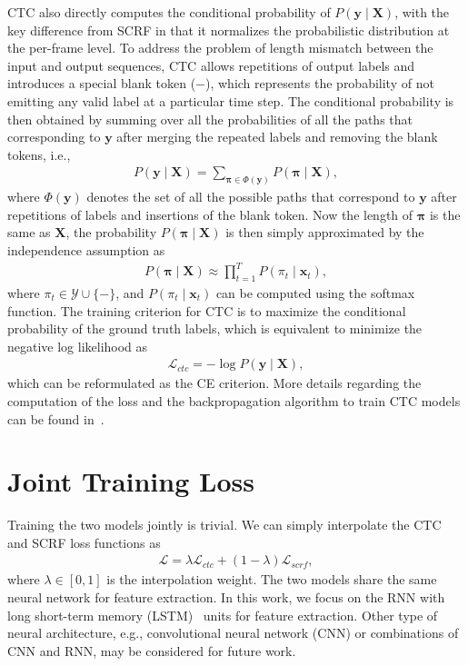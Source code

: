 \documentclass[a4paper]{article}
\begin{document}
CTC also directly computes the conditional probability of $P(\bm y \mid \bm X)$, with the key difference from SCRF in that it normalizes the probabilistic distribution at the per-frame level. To address the problem of length mismatch between the input and output sequences, CTC allows repetitions of output labels and introduces a special  blank token ($-$), which represents the probability of not emitting any valid label at a particular time step. The conditional probability is then obtained by summing over all the probabilities of all the paths that corresponding to $\bm y$ after merging the repeated labels and removing the blank tokens, i.e.,
\begin{align} 
P(\bm y \mid \bm X) = \sum_{\bm \pi \in \Phi(\bm y)} P(\bm \pi \mid \bm X),
\end{align}
where $\Phi(\bm y)$ denotes the set of all the possible paths that correspond to $\bm y$ after repetitions of labels and insertions of the blank token. Now the length of $\bm \pi$ is the same as $\bm X$, the probability $P(\bm \pi \mid \bm X)$ is then simply approximated by the independence assumption as 
\begin{align} 
P(\bm \pi \mid \bm X) \approx \prod_{t=1}^T P(\pi_t \mid \bm x_t),
\end{align}
where $\pi_t \in \mathcal{Y}\cup \{-\}$, and $P(\pi_t \mid \bm x_t)$ can be computed using the softmax function. The training criterion for CTC is to maximize the conditional probability of the ground truth labels, which is equivalent to minimize the negative log likelihood as
\begin{align} 
\mathcal L_{ctc} = -\log P(\bm y \mid \bm X),
\end{align}
which can be reformulated as the CE criterion. More details regarding the computation of the loss and the backpropagation algorithm to train CTC models can be found in~\cite{graves2006connectionist}. 


\section{Joint Training Loss}

Training the two models jointly is trivial.  We can simply interpolate the CTC and SCRF loss functions as
\begin{align} 
\label{eq:mtl}
\mathcal L = \lambda \mathcal{L}_{ctc} + (1-\lambda)\mathcal{L}_{scrf},
\end{align}
where $\lambda \in[0, 1]$ is the interpolation weight. The two models share the same neural network for feature extraction. In this work, we focus on the RNN with long short-term memory (LSTM)~\cite{hochreiter1997long} units for feature extraction. Other type of neural architecture, e.g., convolutional neural network (CNN) or combinations of CNN and RNN, may be considered for future work. 
\end{document}
